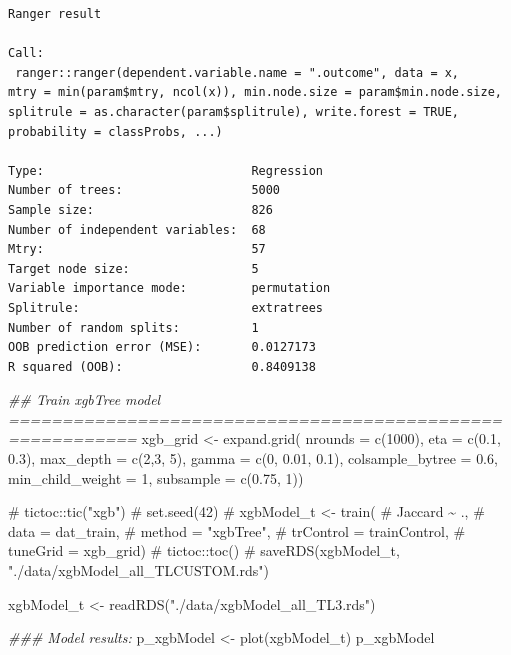 \documentclass[
  letterpaper,
  DIV=11,
  numbers=noendperiod]{scrartcl}
\newenvironment{Shaded}{\begin{snugshade}}{\end{snugshade}}
\newcommand{\AttributeTok}[1]{\textcolor[rgb]{0.40,0.45,0.13}{#1}}
\newcommand{\CommentTok}[1]{\textcolor[rgb]{0.37,0.37,0.37}{#1}}
\newcommand{\DecValTok}[1]{\textcolor[rgb]{0.68,0.00,0.00}{#1}}
\newcommand{\DocumentationTok}[1]{\textcolor[rgb]{0.37,0.37,0.37}{\textit{#1}}}
\newcommand{\FloatTok}[1]{\textcolor[rgb]{0.68,0.00,0.00}{#1}}
\newcommand{\FunctionTok}[1]{\textcolor[rgb]{0.28,0.35,0.67}{#1}}
\newcommand{\NormalTok}[1]{\textcolor[rgb]{0.00,0.23,0.31}{#1}}
\newcommand{\OtherTok}[1]{\textcolor[rgb]{0.00,0.23,0.31}{#1}}
\newcommand{\SpecialCharTok}[1]{\textcolor[rgb]{0.37,0.37,0.37}{#1}}
\newcommand{\StringTok}[1]{\textcolor[rgb]{0.13,0.47,0.30}{#1}}
\begin{document}
\begin{Shaded}
\end{Shaded}

\begin{verbatim}
Ranger result

Call:
 ranger::ranger(dependent.variable.name = ".outcome", data = x,      mtry = min(param$mtry, ncol(x)), min.node.size = param$min.node.size,      splitrule = as.character(param$splitrule), write.forest = TRUE,      probability = classProbs, ...) 

Type:                             Regression 
Number of trees:                  5000 
Sample size:                      826 
Number of independent variables:  68 
Mtry:                             57 
Target node size:                 5 
Variable importance mode:         permutation 
Splitrule:                        extratrees 
Number of random splits:          1 
OOB prediction error (MSE):       0.0127173 
R squared (OOB):                  0.8409138 
\end{verbatim}

\begin{Shaded}
\begin{Highlighting}[]
\DocumentationTok{\#\# Train xgbTree model ==========================================================}
\NormalTok{xgb\_grid }\OtherTok{\textless{}{-}} \FunctionTok{expand.grid}\NormalTok{(}
  \AttributeTok{nrounds =} \FunctionTok{c}\NormalTok{(}\DecValTok{1000}\NormalTok{),}
  \AttributeTok{eta =} \FunctionTok{c}\NormalTok{(}\FloatTok{0.1}\NormalTok{, }\FloatTok{0.3}\NormalTok{),}
  \AttributeTok{max\_depth =} \FunctionTok{c}\NormalTok{(}\DecValTok{2}\NormalTok{,}\DecValTok{3}\NormalTok{, }\DecValTok{5}\NormalTok{),}
  \AttributeTok{gamma =} \FunctionTok{c}\NormalTok{(}\DecValTok{0}\NormalTok{, }\FloatTok{0.01}\NormalTok{, }\FloatTok{0.1}\NormalTok{),}
  \AttributeTok{colsample\_bytree =} \FloatTok{0.6}\NormalTok{,}
  \AttributeTok{min\_child\_weight =} \DecValTok{1}\NormalTok{,}
  \AttributeTok{subsample =} \FunctionTok{c}\NormalTok{(}\FloatTok{0.75}\NormalTok{, }\DecValTok{1}\NormalTok{))}

\CommentTok{\# tictoc::tic("xgb")}
\CommentTok{\# set.seed(42)}
\CommentTok{\# xgbModel\_t \textless{}{-} train(}
\CommentTok{\#     Jaccard \textasciitilde{} .,}
\CommentTok{\#     data = dat\_train,}
\CommentTok{\#     method = "xgbTree",}
\CommentTok{\#     trControl = trainControl,}
\CommentTok{\#     tuneGrid = xgb\_grid)}
\CommentTok{\# tictoc::toc()}
\CommentTok{\# saveRDS(xgbModel\_t, "./data/xgbModel\_all\_TLCUSTOM.rds")}

\NormalTok{xgbModel\_t }\OtherTok{\textless{}{-}} \FunctionTok{readRDS}\NormalTok{(}\StringTok{"./data/xgbModel\_all\_TL3.rds"}\NormalTok{)}

\DocumentationTok{\#\#\# Model results:}
\NormalTok{p\_xgbModel }\OtherTok{\textless{}{-}} \FunctionTok{plot}\NormalTok{(xgbModel\_t)}
\NormalTok{p\_xgbModel}
\end{Highlighting}
\end{Shaded}
\end{document}
